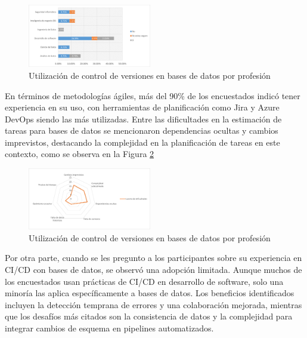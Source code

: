 \documentclass{IEEEtran}
\begin{document}
\begin{figure}[H]
    \centering
    \includegraphics[width=0.48\textwidth]{images/vcsDBbyProfesion.png}
    \caption{Utilización de control de versiones en bases de datos por profesión}
    \label{fig:vcsDBbyProfesion}
\end{figure}

En términos de metodologías ágiles, más del 90\% de los encuestados indicó tener experiencia en su uso, con herramientas de planificación como Jira y Azure DevOps siendo las más utilizadas. Entre las dificultades en la estimación de tareas para bases de datos se mencionaron dependencias ocultas y cambios imprevistos, destacando la complejidad en la planificación de tareas en este contexto, como se observa en la Figura \ref{fig:dificultades}

\begin{figure}[H]
    \centering
    \includegraphics[width=0.48\textwidth]{images/dificultades.png}
    \caption{Utilización de control de versiones en bases de datos por profesión}
    \label{fig:dificultades}
\end{figure}

Por otra parte, cuando se les pregunto a los participantes sobre su experiencia en CI/CD con bases de datos, se observó una adopción limitada. Aunque muchos de los encuestados usan prácticas de CI/CD en desarrollo de software, solo una minoría las aplica específicamente a bases de datos. Los beneficios identificados incluyen la detección temprana de errores y una colaboración mejorada, mientras que los desafíos más citados son la consistencia de datos y la complejidad para integrar cambios de esquema en pipelines automatizados.


\end{document}
